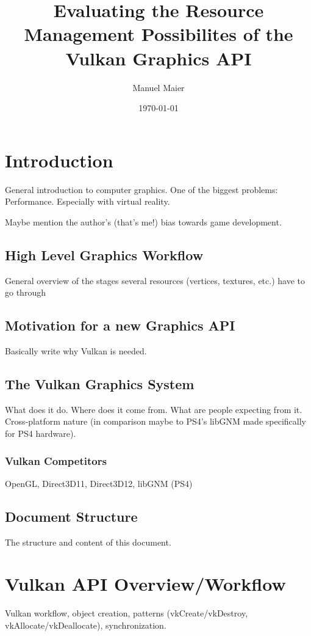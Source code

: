 \documentclass[draft,12pt]{report}
\title{Evaluating the Resource Management Possibilites of the Vulkan Graphics API}
\date{\today}
\author{Manuel Maier}
\begin{document}
  \maketitle
  \newpage

  \tableofcontents
  \newpage




  \chapter{Introduction}
    General introduction to computer graphics. One of the biggest problems: Performance. Especially with virtual reality.

    Maybe mention the author's (that's me!) bias towards game development.

    \section{High Level Graphics Workflow}
      General overview of the stages several resources (vertices, textures, etc.) have to go through

    \section{Motivation for a new Graphics API}
      Basically write why Vulkan is needed.

    \section{The Vulkan Graphics System}
      What does it do. Where does it come from. What are people expecting from it. Cross-platform nature (in comparison maybe to PS4's libGNM made specifically for PS4 hardware).

      \subsection{Vulkan Competitors}
        OpenGL, Direct3D11, Direct3D12, libGNM (PS4)

    \section{Document Structure}
      The structure and content of this document.

  \chapter{Vulkan API Overview/Workflow}
    Vulkan workflow, object creation, patterns (vkCreate/vkDestroy, vkAllocate/vkDeallocate), synchronization.
\end{document}
